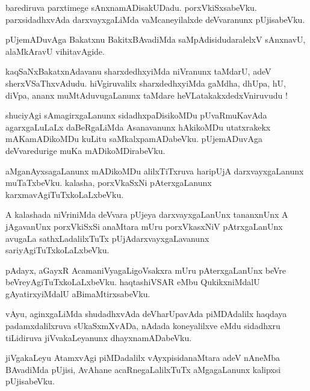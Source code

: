 \documentclass{article}
\begin{document}
\begin{mn}%
barediruva parxtimege sAnxnamADisakUDadu. porxVkiSxsabeVku. parxsidadhxvAda 
darxvayxgaLiMda vaMcaneyilalxde deVvaranunx pUjisabeVku.
\end{mn}

\begin{mn}%
pUjemADuvAga Bakatxnu BakitxBAvadiMda saMpAdisidudaralelxV sAnxnavU, alaMkAravU vihitavAgide.
\end{mn}

\begin{mn}%
kaqSaNxBakatxnAdavanu sharxdedhxyiMda niVranunx taMdarU, adeV sherxVSaThxvAdudu. 
hiVgiruvalilx sharxdedhxyiMda gaMdha, dhUpa, hU, diVpa, ananx muMtAduvugaLanunx taMdare 
heVLatakakxdedxVniruvudu !
\end{mn}

\begin{mn}%
shuciyAgi sAmagirxgaLanunx sidadhxpaDisikoMDu pUvaRmuKavAda agarxgaLuLaLx daBeRgaLiMda 
Asanavanunx hAkikoMDu utatxrakekx mAKamADikoMDu kuLitu saMkalxpamADabeVku. pUjemADuvAga 
deVvaredurige muKa mADikoMDirabeVku.
\end{mn}

\begin{mn}%
aMganAyxsagaLanunx mADikoMDu alilxTiTxruva haripUjA darxvayxgaLanunx muTaTxbeVku. kalasha, 
porxVkaSxNi pAterxgaLanunx karxmavAgiTuTxkoLaLxbeVku.
\end{mn}

\begin{mn}%
A kalashada niVriniMda deVvara pUjeya darxvayxgaLanUnx tananxnUnx A jAgavanUnx porxVkiSxSi 
anaMtara mUru porxVkasxNiV pAtrxgaLanUnx avugaLa sathxLadalilxTuTx pUjAdarxvayxgaLavanunx 
sariyAgiTuTxkoLaLxbeVku.
\end{mn}

\begin{mn}%
pAdayx, aGayxR AcamaniVyagaLigoVsakxra mUru pAterxgaLanUnx beVre beVreyAgiTuTxkoLaLxbeVku. 
haqtashiVSAR eMbu QukikxniMdalU gAyatirxyiMdalU aBimaMtirxsabeVku.
\end{mn}

\begin{mn}%
vAyu, aginxgaLiMda shudadhxvAda deVharUpavAda piMDAdalilx haqdaya padamxdalilxruva 
sUkaSxmXvADa, nAdada koneyalilxve eMdu sidadhxru tiLidiruva jiVvakaLeyanunx 
dhayxnamADabeVku.
\end{mn}

\begin{mn}%
jiVgakaLeyu AtamxvAgi piMDadalilx vAyxpisidanaMtara adeV nAneMba BAvadiMda pUjisi, AvAhane 
acaRnegaLalilxTuTx aMgagaLanunx kalipxsi pUjisabeVku.
\end{mn}
\end{document}
